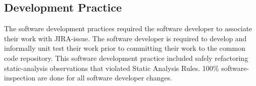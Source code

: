 \subsection{Development Practice}
The software development practices required the software developer to associate
their work with JIRA-issue. The software developer is required to develop and
informally unit test their work prior to committing their work to the common
code repository. This software development practice included safely refactoring
\gls{static-analysis} observations that violated Static Analysis Rules. 100\%
\gls{software-inspection} are done for all software developer changes.
